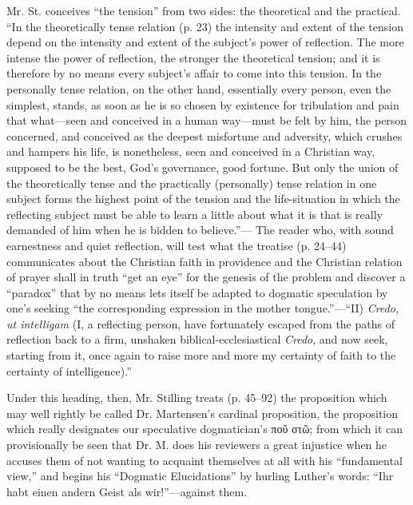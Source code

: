 \documentclass[12pt,a4paper,openany]{book}
\newcommand{\opage}[1]{\marginnote{\footnotesize\textit{[#1]}}}
\begin{document}
Mr. St. conceives ``the tension'' from two sides: the
theoretical and the practical. ``In the theoretically tense relation
(p. 23) the intensity and extent of the tension depend
on the intensity and extent of the subject's power of reflection.
The more intense the power of reflection, the stronger the theoretical tension;
and it is therefore by no means every subject's affair
to come into this tension. In the personally tense relation,
on the other hand, essentially every person, even the simplest, stands,
as soon as he is so chosen by existence for
tribulation and pain that what---seen and conceived in a
human way---must be felt by him, the person concerned,
and conceived as the deepest misfortune and adversity, which crushes
and hampers his life, is nonetheless, seen and conceived in a Christian
way, supposed to be the best, God's governance, good fortune. But
\setcounter{footnote}{0}%
\opage{19}only the union of the theoretically tense and the practically
(personally) tense relation in one subject forms the highest point of the tension
and the life-situation in which the reflecting
subject must be able to learn a little about what it
is that is really demanded of him when he is bidden to believe.''---
The reader who, with sound earnestness and quiet reflection, will
test what the treatise (p. 24--44) communicates about the
Christian faith in providence and the Christian relation of prayer shall in
truth ``get an eye'' for the genesis of the problem and discover
a ``paradox'' that by no means lets itself be adapted to dogmatic
speculation by one's seeking ``the corresponding expression
in the mother tongue.''---``II) \textit{Credo, ut intelligam} (I, a reflecting person, have
fortunately escaped from the paths of reflection back to a firm,
unshaken biblical-ecclesiastical \textit{Credo}, and now seek, starting
from it, once again to raise more and more my certainty of faith to the
certainty of intelligence).''

Under this heading, then, Mr. Stilling treats
(p. 45--92) the proposition which may well rightly be called
Dr. Martensen's cardinal proposition, the proposition which really
designates our speculative dogmatician's ποῦ στῶ; from which
it can provisionally be seen that Dr. M. does his reviewers
a great injustice when he accuses them of not wanting
to acquaint themselves at all with his ``fundamental view,'' and begins his
``Dogmatic Elucidations'' by hurling Luther's words:
``Ihr habt einen andern Geist als wir!''---against them.
\end{document}
